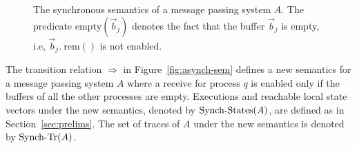 \begin{figure} [t]
\footnotesize{
  \centering
  \begin{mathpar}

    
    
  \end{mathpar}
  }
  \caption{The synchronous semantics of a message passing system $A$. The predicate $\mathrm{empty}(\vec{b}_j)$ denotes the fact that the buffer $\vec{b}_j$ is empty, i.e, $\vec{b}_j.\ \mathrm{rem}()$ is not enabled.}
  \label{fig:synch-sem}
\end{figure}

The transition relation $\Rightarrow$ in Figure~\ref{fig:asynch-sem} defines a new semantics for  a message passing system $A$
where a receive for process $q$ is enabled only if the buffers of all the other processes are empty. Executions and reachable local
state vectors under the new semantics, denoted by $\synch{States}(A)$, are defined as in Section~\ref{sec:prelims}.
The set of traces of $A$ under the new semantics is denoted by $\synch{Tr}(A)$.

